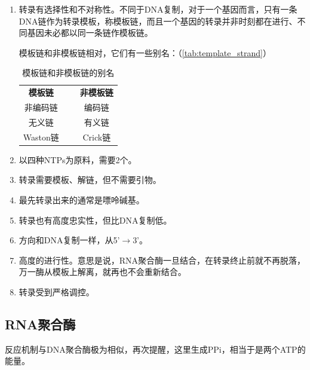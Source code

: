 \begin{enumerate}
	\item 转录有选择性和不对称性。不同于DNA复制，对于一个基因而言，只有一条DNA链作为转录模板，称模板链，而且一个基因的转录并非时刻都在进行、不同基因未必都以同一条链作模板链。

	模板链和非模板链相对，它们有一些别名：（\autoref{tab:template_strand}）

	\begin{table}[h!]
		\centering
		\begin{tabular}{|c|l|c|}
			\cline{1-1} \cline{3-3}
			\textbf{模板链} & ~ & \textbf{非模板链} \\ \cline{1-1} \cline{3-3}
			非编码链 &  & 编码链 \\ \cline{1-1} \cline{3-3}
			无义链 &  & 有义链 \\ \cline{1-1} \cline{3-3}
			Waston链 &  & Crick链 \\ \cline{1-1} \cline{3-3}
		\end{tabular}
		\caption{模板链和非模板链的别名}
		\label{tab:template_strand}
	\end{table}

	\item 以四种NTPs为原料，需要2个。
	\item 转录需要模板、解链，但不需要引物。
	\item 最先转录出来的通常是嘌呤碱基。
	\item 转录也有高度忠实性，但比DNA复制低。
	\item 方向和DNA复制一样，从5'$\longrightarrow$3'。
	\item 高度的进行性。意思是说，RNA聚合酶一旦结合，在转录终止前就不再脱落，万一酶从模板上解离，就再也不会重新结合。
	\item 转录受到严格调控。
\end{enumerate}

\subsection{RNA聚合酶}

反应机制与DNA聚合酶极为相似，再次提醒，这里生成PPi，相当于是两个ATP的能量。


